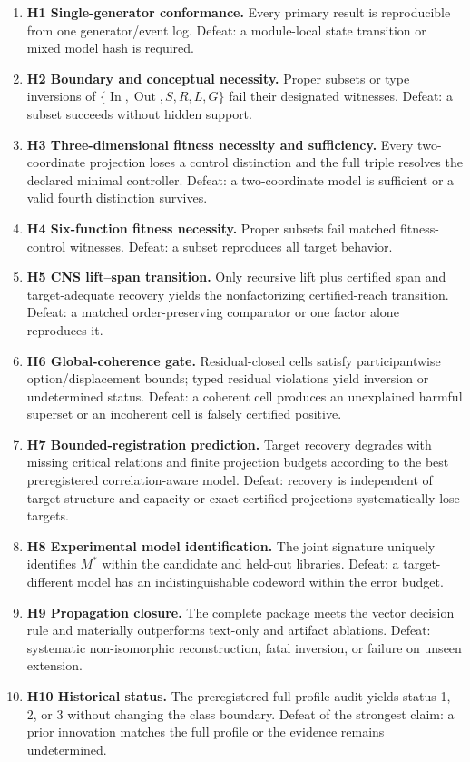 \documentclass[11pt]{article}
\newcommand{\InOp}{\operatorname{In}}
\newcommand{\OutOp}{\operatorname{Out}}
\begin{document}
\begin{enumerate}
\item \textbf{H1 Single-generator conformance.} Every primary result is reproducible from one generator/event log. Defeat: a module-local state transition or mixed model hash is required.
\item \textbf{H2 Boundary and conceptual necessity.} Proper subsets or type inversions of $\{\InOp,\OutOp,S,R,L,G\}$ fail their designated witnesses. Defeat: a subset succeeds without hidden support.
\item \textbf{H3 Three-dimensional fitness necessity and sufficiency.} Every two-coordinate projection loses a control distinction and the full triple resolves the declared minimal controller. Defeat: a two-coordinate model is sufficient or a valid fourth distinction survives.
\item \textbf{H4 Six-function fitness necessity.} Proper subsets fail matched fitness-control witnesses. Defeat: a subset reproduces all target behavior.
\item \textbf{H5 CNS lift--span transition.} Only recursive lift plus certified span and target-adequate recovery yields the nonfactorizing certified-reach transition. Defeat: a matched order-preserving comparator or one factor alone reproduces it.
\item \textbf{H6 Global-coherence gate.} Residual-closed cells satisfy participantwise option/displacement bounds; typed residual violations yield inversion or undetermined status. Defeat: a coherent cell produces an unexplained harmful superset or an incoherent cell is falsely certified positive.
\item \textbf{H7 Bounded-registration prediction.} Target recovery degrades with missing critical relations and finite projection budgets according to the best preregistered correlation-aware model. Defeat: recovery is independent of target structure and capacity or exact certified projections systematically lose targets.
\item \textbf{H8 Experimental model identification.} The joint signature uniquely identifies $M^\ast$ within the candidate and held-out libraries. Defeat: a target-different model has an indistinguishable codeword within the error budget.
\item \textbf{H9 Propagation closure.} The complete package meets the vector decision rule and materially outperforms text-only and artifact ablations. Defeat: systematic non-isomorphic reconstruction, fatal inversion, or failure on unseen extension.
\item \textbf{H10 Historical status.} The preregistered full-profile audit yields status 1, 2, or 3 without changing the class boundary. Defeat of the strongest claim: a prior innovation matches the full profile or the evidence remains undetermined.
\end{enumerate}
\end{document}

